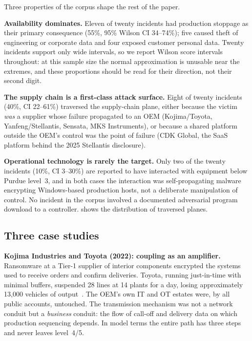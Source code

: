 Three properties of the corpus shape the rest of the paper.

\textbf{Availability dominates.} Eleven of twenty incidents had production
stoppage as their primary consequence (55\%, 95\% Wilson CI 34--74\%); five
caused theft of engineering or corporate data and four exposed customer
personal data. Twenty incidents support only wide intervals, so we report
Wilson score intervals throughout: at this sample size the normal approximation
is unusable near the extremes, and these proportions should be read for their
direction, not their second digit.

\textbf{The supply chain is a first-class attack surface.} Eight of twenty
incidents (40\%, CI 22--61\%) traversed the supply-chain plane, either because the victim
\emph{was} a supplier whose failure propagated to an OEM (Kojima/Toyota,
Yanfeng/Stellantis, Sensata, MKS Instruments), or because a shared platform
outside the OEM's control was the point of failure (CDK Global, the SaaS
platform behind the 2025 Stellantis disclosure).

\textbf{Operational technology is rarely the target.} Only two of the twenty
incidents (10\%, CI 3--30\%) are reported to have interacted with equipment
below Purdue level~3, and in both cases the interaction was self-propagating malware
encrypting Windows-based production hosts, not a deliberate manipulation of
control. No incident in the corpus involved a documented
adversarial program download to a controller.  shows
the distribution of traversed planes.



\subsection{Three case studies}

\textbf{Kojima Industries and Toyota (2022): coupling as an amplifier.}
Ransomware at a Tier-1 supplier of interior components encrypted the systems
used to receive orders and confirm deliveries. Toyota, running just-in-time
with minimal buffers, suspended 28 lines at 14 plants for a day, losing
approximately 13,000 vehicles of output~\cite{inc04toyota,inc04infosec}. The
OEM's own IT and OT estates were, by all public accounts, untouched. The
transmission mechanism was not a network conduit but a \emph{business}
conduit: the flow of call-off and delivery data on which production sequencing
depends. In model terms the entire path has three steps and never leaves
level~4/5.

